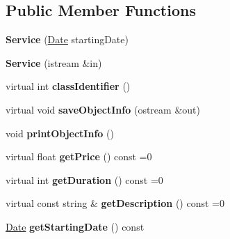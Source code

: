 \subsection*{Public Member Functions}
\begin{DoxyCompactItemize}
\item 
\hypertarget{class_service_a70b17e468ca513b3d379b81349614594}{}{\bfseries Service} (\hyperlink{struct_date}{Date} starting\+Date)\label{class_service_a70b17e468ca513b3d379b81349614594}

\item 
\hypertarget{class_service_ada80b8d4356fb275d1b45777b08f2d00}{}{\bfseries Service} (istream \&in)\label{class_service_ada80b8d4356fb275d1b45777b08f2d00}

\item 
\hypertarget{class_service_a55a7bfff43a2cf1fad22749475be2bc4}{}virtual int {\bfseries class\+Identifier} ()\label{class_service_a55a7bfff43a2cf1fad22749475be2bc4}

\item 
\hypertarget{class_service_a3f7311721c3bced9b3effec67ac50319}{}virtual void {\bfseries save\+Object\+Info} (ostream \&out)\label{class_service_a3f7311721c3bced9b3effec67ac50319}

\item 
\hypertarget{class_service_ac89fe4d9ab6fcf8e42e85e5f4d6f9fb9}{}void {\bfseries print\+Object\+Info} ()\label{class_service_ac89fe4d9ab6fcf8e42e85e5f4d6f9fb9}

\item 
\hypertarget{class_service_a054bc119ce47bf2ca559f14bbdfe1ee4}{}virtual float {\bfseries get\+Price} () const  =0\label{class_service_a054bc119ce47bf2ca559f14bbdfe1ee4}

\item 
\hypertarget{class_service_a31d668e91f3b357f892bfb8a50840fdb}{}virtual int {\bfseries get\+Duration} () const  =0\label{class_service_a31d668e91f3b357f892bfb8a50840fdb}

\item 
\hypertarget{class_service_a666263257ab2bdbd270fbeb34f1edbd3}{}virtual const string \& {\bfseries get\+Description} () const  =0\label{class_service_a666263257ab2bdbd270fbeb34f1edbd3}

\item 
\hypertarget{class_service_a6977a78bac9e8007b24baec0ff3ce01e}{}\hyperlink{struct_date}{Date} {\bfseries get\+Starting\+Date} () const \label{class_service_a6977a78bac9e8007b24baec0ff3ce01e}

\end{DoxyCompactItemize}
